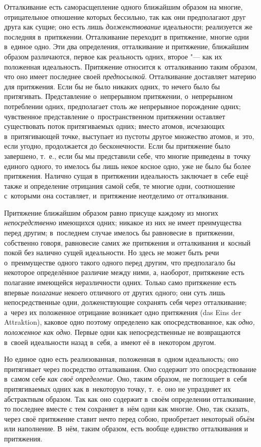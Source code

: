 
Отталкивание есть саморасщепление одного ближайшим образом на многие,
отрицательное отношение которых бессильно, так как они предполагают друг
друга как сущие; оно есть лишь {\em долженствование}
идеальности; реализуется же последняя в~притяжении. Отталкивание переходит
в притяжение, многие одни в~единое одно. Эти два определения, отталкивание
и притяжение, ближайшим образом различаются, первое как реальность одних,
второе "--- как их положенная идеальность. Притяжение относится к~отталкиванию
таким образом, что оно имеет последнее своей
{\em предпосылкой}. Отталкивание доставляет материю для
притяжения. Если бы не было никаких одних, то нечего было бы притягивать.
Представление о~непрерывном притяжении, о~непрерывном потреблении одних,
предполагает столь же непрерывное порождение одних; чувственное
представление о~пространственном притяжении оставляет существовать поток
притягиваемых одних; вместо атомов, исчезающих в~притягивающей точке,
выступает из пустоты другое множество атомов, и~это, если угодно,
продолжается до бесконечности. Если бы притяжение было завершено, т.~е.,
если бы мы представили себе, что многие приведены в~точку единого одного,
то имелось бы лишь некое косное одно, уже не было бы более притяжения.
Налично сущая в~притяжении идеальность заключает в~себе ещё также и
определение отрицания самой себя, те многие одни, соотношение с~которыми
она составляет, и~притяжение неотделимо от отталкивания.

Притяжение ближайшим образом равно присуще каждому из многих
{\em непосредственно} имеющихся одних; никакое из них
не имеет преимущества перед другим; в~последнем случае имелось бы
равновесие в~притяжении, собственно говоря, равновесие самих же притяжения
и отталкивания и~косный покой без налично сущей идеальности. Но здесь не
может быть речи о~преимуществе одного такого одного перед другим, что
предполагало бы некоторое определённое различие между ними, а, наоборот,
притяжение есть полагание имеющейся неразличности одних. Только само
притяжение есть впервые {\em полагание} некоего
отличного от других одного; они суть лишь непосредственные одни,
долженствующие сохранять себя через отталкивание; а~через их положенное
отрицание возникает одно притяжения (das Eins der Attraktion), каковое одно
поэтому определено как опосредствованное, как
{\em одно, положенное как одно}. Первые одни как
непосредственные не возвращаются в~своей идеальности назад в~себя, а~имеют
её в~некотором другом.

Но единое одно есть реализованная, положенная в~одном идеальность; оно
притягивает через посредство отталкивания. Оно содержит это
опосредствование в~самом себе {\em как своё
определение}. Оно, таким образом, не поглощает в~себя притягиваемых одних
как в~некоторую точку, т.~е. оно не упраздняет их абстрактным образом. Так
как оно содержит в~своём определении отталкивание, то последнее вместе с
тем сохраняет в~нём одни как многие. Оно, так сказать, через своё
притяжение ставит нечто перед собою, приобретает некоторый объём или
наполнение. В~нём, таким образом, есть вообще единство отталкивания и
притяжения.

